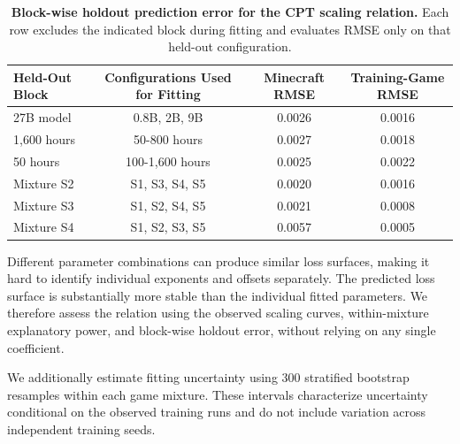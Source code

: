 \begin{table}[t]
    \centering
    \small
    \setlength{\tabcolsep}{4pt}
    \renewcommand{\arraystretch}{1.08}
    \begin{tabular}{lccc}
        \toprule
        \textbf{Held-Out Block}
        & \textbf{Configurations Used for Fitting}
        & \textbf{Minecraft RMSE}
        & \textbf{Training-Game RMSE} \\
        \midrule
        
        27B model
        & 0.8B, 2B, 9B
        & 0.0026
        & 0.0016 \\
        
        1,600 hours
        & 50-800 hours
        & 0.0027
        & 0.0018 \\
        
        50 hours
        & 100-1,600 hours
        & 0.0025
        & 0.0022 \\
        
        Mixture S2
        & S1, S3, S4, S5
        & 0.0020
        & 0.0016 \\
        
        Mixture S3
        & S1, S2, S4, S5
        & 0.0021
        & 0.0008 \\
        
        Mixture S4
        & S1, S2, S3, S5
        & 0.0057
        & 0.0005 \\
        
        \bottomrule
    \end{tabular}
    \caption{
    \textbf{Block-wise holdout prediction error for the CPT scaling relation.}
    Each row excludes the indicated block during fitting and evaluates RMSE only on that held-out configuration.
    }
    \label{tab:scaling_holdout}
\end{table}



Different parameter combinations can produce similar loss surfaces, making it hard to identify individual exponents and offsets separately.
The predicted loss surface is substantially more stable than the individual fitted parameters.
We therefore assess the relation using the observed scaling curves, within-mixture explanatory power, and block-wise holdout error, without relying on any single coefficient.

We additionally estimate fitting uncertainty using 300 stratified bootstrap resamples within each game mixture.
These intervals characterize uncertainty conditional on the observed training runs and do not include variation across independent training seeds.

